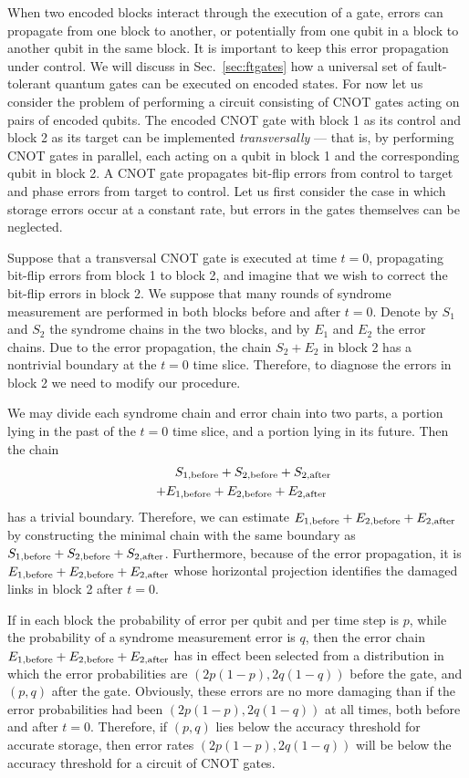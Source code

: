 When two encoded blocks interact through the execution of a gate, errors can propagate from one block to another, or potentially from one qubit in a block to another qubit in the same block. It is important to keep this error propagation under control. We will discuss in Sec.~\ref{sec:ftgates} how a universal set of fault-tolerant quantum gates can be executed on encoded states. For now let us consider the problem of performing a circuit consisting of CNOT gates acting on pairs of encoded qubits. The encoded CNOT gate with block 1 as its control and block 2 as its target can be implemented {\em transversally} --- that is, by performing CNOT gates in parallel, each acting on a qubit in block 1 and the corresponding qubit in block 2. A CNOT gate propagates bit-flip errors from control to target and phase errors from target to control. Let us first consider the case in which storage errors occur at a constant rate, but errors in the gates themselves can be neglected. 

Suppose that a transversal CNOT gate is executed at time $t=0$, propagating bit-flip errors from block 1 to block 2, and imagine that we wish to correct the bit-flip errors in block 2. We suppose that many rounds of syndrome measurement are performed in both blocks  before and after $t=0$. Denote by $S_1$ and $S_2$ the syndrome chains in the two blocks, and by $E_1$ and $E_2$ the error chains. Due to the error propagation, the chain $S_2+E_2$ in block 2 has a nontrivial boundary at the $t=0$ time slice. Therefore, to diagnose the errors in block 2 we need to modify our procedure.  

We may divide each syndrome chain and error chain into two parts, a portion lying in the past of the $t=0$ time slice, and a portion lying in its future. Then the chain 
\begin{eqnarray}
&&S_{1,\rm before} + S_{2,\rm before} +S_{2,\rm after} \nonumber\\
&&+E_{1,\rm before} + E_{2,\rm before} +E_{2,\rm after}~
\end{eqnarray}
has a trivial boundary. Therefore, we can estimate $E_{1,\rm before} + E_{2,\rm before} +E_{2,\rm after}$ by constructing the minimal chain with the same boundary as $S_{1,\rm before} + S_{2,\rm before} +S_{2,\rm after}$. Furthermore, because of the error propagation, it is $E_{1,\rm before} + E_{2,\rm before} +E_{2,\rm after}$ whose horizontal projection identifies the damaged links in block 2 after $t=0$. 

If in each block the probability of error per qubit and per time step is $p$, while the probability of a syndrome measurement error is $q$, then the error chain $E_{1,\rm before} + E_{2,\rm before} +E_{2,\rm after}$ has in effect been selected from a distribution in which the error probabilities are $(2p(1-p),2q(1-q))$ before the gate, and $(p,q)$ after the gate. Obviously, these errors are no more damaging than if the error probabilities had been $(2p(1-p),2q(1-q))$ at all times, both before and after $t=0$. Therefore, if $(p,q)$ lies below the accuracy threshold for accurate storage, then error rates $(2p(1-p),2q(1-q))$ will be below the accuracy threshold for a circuit of CNOT gates.

